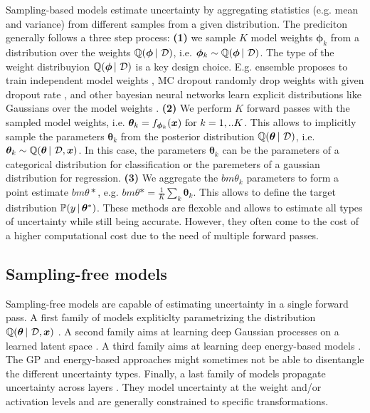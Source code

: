 Sampling-based models estimate uncertainty by aggregating statistics (e.g. mean and variance) from different samples from a given distribution. The prediciton generally follows a three step process:
\textbf{(1)} we sample $K$ model weights $\bm{\phi}_k$ from a distribution over the weights $\operatorname{\mathbb{Q}}(\bm{\phi} \,|\, \operatorname{\mathcal{D}})$, i.e. $\bm{\phi}_k \sim \operatorname{\mathbb{Q}}(\bm{\phi} \,|\, \operatorname{\mathcal{D}})$. The type of the weight distribuyion $\operatorname{\mathbb{Q}}(\bm{\phi} \,|\, \operatorname{\mathcal{D}})$ is a key design choice. E.g. ensemble proposes to train independent model weights \cite{ensemble_simple}, MC dropout randomly drop weights with given dropout rate \cite{drop_out}, and other bayesian neural networks learn explicit distributions like Gaussians over the model weights \cite{bayesian-networks}. \textbf{(2)} We perform $K$ forward passes with the sampled model weights, i.e. $\bm{\theta}_k = f_{\bm{\phi}_k}(\bm{x}) \text{ for } k=1,..K$. This allows to implicitly sample the parameters $\bm{\theta}_k$ from the posterior distribution $\operatorname{\mathbb{Q}}(\bm{\theta} \,|\, \operatorname{\mathcal{D}})$, i.e. $\bm{\theta}_k \sim \operatorname{\mathbb{Q}}(\bm{\theta} \,|\, \operatorname{\mathcal{D}}, \bm{x})$. In this case, the parameters $\bm{\theta}_k$ can be the parameters of a categorical distribution for classification or the paremeters of a gaussian distribution for regression. \textbf{(3)} We aggregate the $bm{\theta}_k$ parameters to form a point estimate $bm{\theta}*$, e.g. $bm{\theta}*=\frac{1}{K}\sum_k \bm{\theta}_k$. This allows to define the target distribution $\mathbb{P}(y \,|\, \bm{\theta}^*)$. These methods are flexoble and allows to estimate all types of uncertainty while still being accurate. However, they often come to the cost of a higher computational cost due to the need of multiple forward passes.

\subsection{Sampling-free models}
Sampling-free models are capable of estimating uncertainty in a single forward pass. A first family of models expliticlty parametrizing the distribution $\operatorname{\mathbb{Q}}(\bm{\theta} \,|\, \operatorname{\mathcal{D}}, \bm{x})$ \citep{survey_evidential_uncertainty,evaluating_dbu,max_gap_id_ood,uncertainty-generative-classifier,multifaceted_uncertainty,graph_posterior, lightweight-prob-net}. A second family aims at learning deep Gaussian processes on a learned latent space \citep{uncertainty-distance-awareness, due, duq, uceloss}. A third family aims at learning deep energy-based models \citep{ood_ebm, jem_ebm}. The GP and energy-based approaches might sometimes not be able to disentangle the different uncertainty types. Finally, a last family of models propagate uncertainty across layers \citep{natural-parameter-network, sampling-free-variance-propagation, feed-forward-propagation, lightweight-prob-net, probabilistic-backprop-scalable-bnn}. They model uncertainty at the weight and/or activation levels and are generally constrained to specific transformations.

